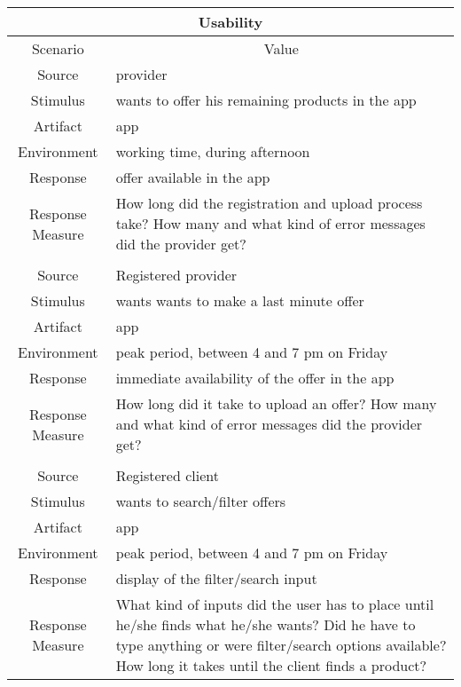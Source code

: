 \begin{table}[H]
    \begin{tabularx}{\textwidth}{|c|X|}
        \hline
        \multicolumn{2}{c}{\textbf{Usability}} \\
        \hline
        \toprule
        \multicolumn{1}{c}{Scenario} & \multicolumn{1}{c}{Value} \\
        \midrule
        Source & \gls{provider} \\
        Stimulus & wants to offer his remaining products in the app \\
        Artifact & app \\
        Environment & working time, during afternoon \\
        Response & offer available in the app \\
        Response Measure & How long did the registration and upload process take? How many and what kind of error messages
        did the \gls{provider} get?\\
         & \\
        Source & Registered \gls{provider} \\
        Stimulus & wants wants to make a last minute offer \\
        Artifact & app \\
        Environment & peak period, between 4 and 7 pm on Friday \\
        Response & immediate availability of the offer in the app \\
        Response Measure & How long did it take to upload an offer? How many and what kind of error messages did the 
        \gls{provider} get? \\
        & \\
        Source & Registered \gls{client} \\
        Stimulus & wants to search/filter offers \\
        Artifact & app \\
        Environment & peak period, between 4 and 7 pm on Friday \\
        Response & display of the filter/search input \\
        Response Measure & What kind of inputs did the user has to place until he/she finds what he/she wants?
        Did he have to type anything or were filter/search options available? How long it takes until the client
        finds a product? \\
        \bottomrule
    \end{tabularx}
\end{table}


